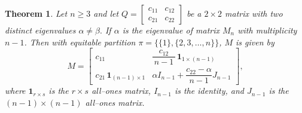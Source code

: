 \documentclass[12pt,twoside]{article}
\newtheorem{theorem}{Theorem}[section]
\begin{document}
\begin{theorem}\label{thm:n-by-n-two-eigs}
	Let $n\ge 3$ and let $Q=\begin{bmatrix} c_{11} & c_{12} \\ c_{21} & c_{22} \end{bmatrix}$
	be a $2\times 2$ matrix with two distinct eigenvalues $ \alpha\neq\beta.$ If $\alpha$ is the eigenvalue of matrix $M_{n}$ with multiplicity $n-1$. Then  with equitable  partition $\pi=\bigl\{\{1\},\{2,3,\dots,n\}\bigr\}$, $M$ is given by
	\begin{equation}\label{eq:Mn-two-eigs}
		M
		=
		\begin{bmatrix}
			c_{11} & \dfrac{c_{12}}{\,n-1\,}\,\mathbf{1}_{1\times (n-1)}\\
			c_{21}\,\mathbf{1}_{(n-1)\times 1} & \alpha I_{n-1} + \dfrac{c_{22}-\alpha}{\,n-1\,}J_{n-1}
		\end{bmatrix},
	\end{equation}
	where $\mathbf{1}_{r\times s}$ is the $r\times s$ all--ones matrix, $I_{n-1}$ is the identity, and
	$J_{n-1}$ is the $(n-1)\times(n-1)$ all--ones matrix.
\end{theorem}
\end{document}

